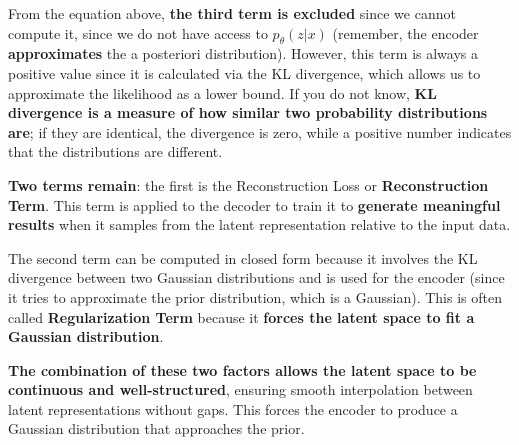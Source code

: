 From the equation above, \textbf{\textcolor{mygreen}{the third term is excluded}} since we cannot compute it, since we do not have access to $p_{\theta}(z|x)$ (remember, the encoder \textbf{approximates} the a posteriori distribution). However, this term is always a positive value since it is calculated via the KL divergence, which allows us to approximate the likelihood as a lower bound. If you do not know, \textbf{KL divergence is a measure of how similar two probability distributions are}; if they are identical, the divergence is zero, while a positive number indicates that the distributions are different.

\textbf{\textcolor{mybluee}{Two terms remain}}: the first is the Reconstruction Loss or \textbf{\textcolor{mybluee}{Reconstruction Term}}. This term is applied to the decoder to train it to \textbf{generate meaningful results} when it samples from the latent representation relative to the input data.

The second term can be computed in closed form because it involves the KL divergence between two Gaussian distributions and is used for the encoder (since it tries to approximate the prior distribution, which is a Gaussian). This is often called \textbf{\textcolor{mybluee}{Regularization Term}} because it \textbf{forces the latent space to fit a Gaussian distribution}.

\textbf{The combination of these two factors allows the latent space to be continuous and well-structured}, ensuring smooth interpolation between latent representations without gaps. This forces the encoder to produce a Gaussian distribution that approaches the prior.

